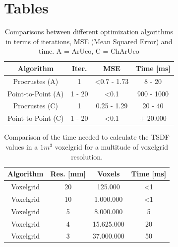 \documentclass[10pt,twocolumn,letterpaper]{article}
\begin{document}
\section{Tables}
\begin{table}[h!]
  \begin{center}
    \begin{tabular}{c|c|c|c}
      \textbf{Algorithm} & \textbf{Iter.} & \textbf{MSE} & \textbf{Time [ms]}\\
      \hline
      Procrustes (A)  & 1  & \textless 0.7 - 1.73 & 8 - 20\\
      Point-to-Point (A) & 1 - 20  & \textless 0.1 & 900 - 1000\\
      Procrustes (C) & 1  & 0.25 - 1.29 & 20 - 40\\
      Point-to-Point (C) & 1 - 20  & \textless 0.1 & $\pm$ 20.000\\
    \end{tabular}
     \caption{Comparisons between different optimization algorithms in terms of iterations, MSE (Mean Squared Error) and time. A = ArUco, C = ChArUco}
     \label{tab:camera-calibration}
  \end{center}
\end{table}

\begin{table}[h!]
  \begin{center}
    \begin{tabular}{c|c|c|c}
      \textbf{Algorithm} & \textbf{Res. [mm]} & \textbf{Voxels} & \textbf{Time [ms]}\\
      \hline
      Voxelgrid & 20 & 125.000 & \textless 1\\
      Voxelgrid & 10 & 1.000.000 & \textless 1\\
      Voxelgrid & 5 & 8.000.000 & 5\\
      Voxelgrid & 4 & 15.625.000 & 20\\
      Voxelgrid & 3 & 37.000.000 & 50\\
    \end{tabular}
     \caption{Comparison of the time needed to calculate the TSDF values in a $1m^3$ voxelgrid for a multitude of voxelgrid resolution.}
     \label{tab:voxelgrid}
  \end{center}
\end{table}
\end{document}
